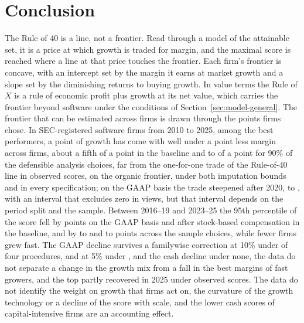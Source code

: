 \section{Conclusion}\label{sec:conclusion}

The Rule of 40 is a line, not a frontier. Read through a model of the attainable set, it is a price at which growth is traded for margin, and the maximal score is reached where a line at that price touches the frontier. Each firm's frontier is concave, with an intercept set by the margin it earns at market growth and a slope set by the diminishing returns to buying growth. In value terms the Rule of $X$ is a rule of economic profit plus growth at its net value, which carries the frontier beyond software under the conditions of Section~\ref{sec:model-general}. The frontier that can be estimated across firms is drawn through the points firms chose. In SEC-registered software firms from 2010 to 2025, among the best performers, a point of growth has come with well under a point less margin across firms, about a fifth of a point in the baseline and \ScPsiOpTypLo{} to \ScPsiOpTypHi{} of a point for 90\% of the defensible analysis choices, far from the one-for-one trade of the Rule-of-40 line in observed scores, on the organic frontier, under both imputation bounds and in every specification; on the GAAP basis the trade steepened after 2020, to \PsiLateOp, with an interval that excludes zero in \PsiDiffOpCountNeg{} views, but that interval depends on the period split and the sample. Between 2016--19 and 2023--25 the 95th percentile of the score fell by \TopFallOpEone{} points on the GAAP basis and \TopFallCashEone{} after stock-based compensation in the baseline, and by \ScTopOpCoreFallLo{} to \ScTopOpCoreFallHi{} and \ScTopCashCoreFallLo{} to \ScTopCashCoreFallHi{} points across the sample choices, while fewer firms grew fast. The GAAP decline survives a familywise correction at 10\% under \TopFamTen{} of four procedures, and at 5\% under \TopFamFive, and the cash decline under none, the data do not separate a change in the growth mix from a fall in the best margins of fast growers, and the top partly recovered in 2025 under observed scores. The data do not identify the weight on growth that firms act on, the curvature of the growth technology or a decline of the score with scale, and the lower cash scores of capital-intensive firms are an accounting effect.

